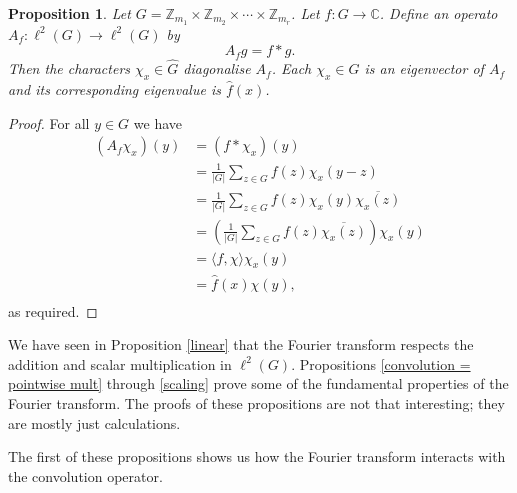 \documentclass[12pt]{article}
\newtheorem{Proposition}{Proposition}
\newcommand{\Z}{\mathbb{Z}}
\newcommand{\C}{\mathbb{C}}
\newcommand{\Zm}{\Z_{m_1}\times \Z_{m_2} \times \cdots \times \Z_{m_r}}
\begin{document}
\begin{Proposition}
    Let $G = \Zm$.
    Let $f:G\to \C$.
    Define an operato $A_f:\ell^2(G)\to \ell^2(G)$
    by
    \[
        A_fg = f*g.
    \]
    Then the characters $\chi_x\in \widehat{G}$ diagonalise $A_f$.
    Each $\chi_x\in \widehat{G}$ is an eigenvector of $A_f$ and its corresponding eigenvalue is $\widehat{f}(x)$.
\end{Proposition}
\begin{proof}
    For all $y\in G$ we have
    \begin{align*}
        (A_f\chi_x) (y)
          & = (f*\chi_x)(y)                                                              \\
          & = \frac{1}{|G|}\sum_{z\in G}f(z)\chi_x(y-z)                                  \\
          & = \frac{1}{|G|}\sum_{z\in G}f(z)\chi_x(y)\overline{\chi_x(z)}                \\
          & = \left(\frac{1}{|G|}\sum_{z\in G}f(z)\overline{\chi_x(z)} \right) \chi_x(y) \\
          & = \langle f, \chi \rangle \chi_x(y)                                          \\
          & = \widehat{f}(x)\chi(y),                                                     \\
    \end{align*}
    as required.
\end{proof}

We have seen in Proposition \ref{linear} that the Fourier transform respects the addition and scalar multiplication in $\ell^2(G)$.
Propositions \ref{convolution = pointwise mult} through \ref{scaling} prove some of the fundamental properties of the Fourier transform.
The proofs of these propositions are not that interesting; they are mostly just calculations.

The first of these propositions shows us how the Fourier transform interacts with the convolution operator.
\end{document}
